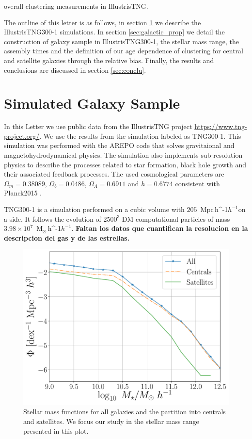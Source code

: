 \documentclass[fleqn,usenatbib]{mnras}
\newcommand{\Msunh}{\,{\rm M}$_{\odot}$\,\ifmmode h^{-1}\else $h^{-1}$\fi}
\newcommand{\Mpch}{\,{\rm Mpc}\,\ifmmode h^{-1}\else $h^{-1}$\fi}
\begin{document}
\citep{2018MNRAS.475..676S} overall clustering measurements in
IllustrisTNG. 

The outline of this letter is as follows, in section \ref{sec:simul}
we describe the IllustrisTNG300-1 simulations. In section
\ref{sec:galactic_prop} we detail the construction of galaxy sample in
IllustrisTNG300-1, the stellar mass range, the assembly times and the
definition of our age dependence of clustering for central and
satellite galaxies through the relative bias. Finally, the results and
conclusions are discussed in section \ref{sec:conclu}. 


\section{Simulated Galaxy Sample}
\label{sec:simul} %

In this Letter we use public data from the IllustrisTNG project
\url{https://www.tng-project.org/}. 
We use the results from the simulation labeled as TNG300-1.
This simulation was performed with the AREPO code
\citep{2018MNRAS.473.4077P} that solves gravitaional and
magnetohydrodynamical physics.
The simulation also implements sub-resolution physics to describe the
processes related to star formation, black hole growth and their
associated feedback processes.
The used cosmological parameters are $\Omega_m=0.38089$,
$\Omega_b=0.0486$, $\Omega_\Lambda= 0.6911$ and $h=0.6774$ consistent
with Planck2015 \citep{2016A&A...594A..13P}. 

TNG300-1 is a simulation performed on a cubic volume
with  $205$ \Mpch on a side.
It follows the evolution of $2500^3$ DM computational particles of
mass $3.98 \times 10^7$ \Msunh. 
\textbf{Faltan los datos que cuantifican la resolucion en la
  descripcion del gas y de las estrellas.}



\begin{figure}
    \centering
    \includegraphics[width=1\columnwidth]{figuras/Histogramas.pdf}
    \caption{Stellar mass functions for all galaxies and the partition
      into centrals and satellites. We focus our study in the stellar
      mass range presented in this plot.} 
    \label{fig:stellar_fuction}
\end{figure}
\end{document}
